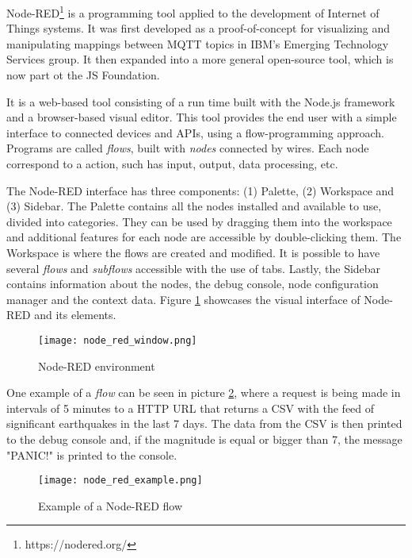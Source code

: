Node-RED\footnote{https://nodered.org/} is a programming tool applied to the development of Internet of Things systems. It was first developed as a proof-of-concept for visualizing and manipulating mappings between MQTT topics in IBM's Emerging Technology Services group. It then expanded into a more general open-source tool, which is now part ot the JS Foundation.
\par It is a web-based tool consisting of a run time built with the Node.js framework and a browser-based visual editor. This tool provides the end user with a simple interface to connected devices and APIs, using a flow-programming approach. Programs are called \emph{flows}, built with \emph{nodes} connected by wires. Each node correspond to a action, such has input, output, data processing, etc. 
\par The Node-RED interface has three components: (1) Palette, (2) Workspace and (3) Sidebar. The Palette contains all the nodes installed and available to use, divided into categories. They can be used by dragging them into the workspace and additional features for each node are accessible by double-clicking them. The Workspace is where the flows are created and modified. It is possible to have several \emph{flows} and \emph{subflows} accessible with the use of tabs. Lastly, the Sidebar contains information about the nodes, the debug console, node configuration manager and the context data. Figure \ref{fig:node_red_window} showcases the visual interface of Node-RED and its elements.

\begin{figure}[h]
\caption{Node-RED environment}
\label{fig:node_red_window}
\centering
\texttt{[image: node\_red\_window.png]}
\end{figure}

\par One example of a \emph{flow} can be seen in picture \ref{fig:node_red_example}, where a request is being made in intervals of 5 minutes to a HTTP URL that returns a CSV with the feed of significant earthquakes in the last 7 days. The data from the CSV is then printed to the debug console and, if the magnitude is equal or bigger than 7, the message "PANIC!" is printed to the console. 

\begin{figure}[!ht]
\caption{Example of a Node-RED flow}
\label{fig:node_red_example}
\centering
\texttt{[image: node\_red\_example.png]}
\end{figure}

